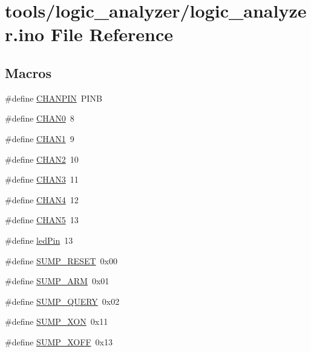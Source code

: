 \hypertarget{logic__analyzer_8ino}{\section{tools/logic\-\_\-analyzer/logic\-\_\-analyzer.ino File Reference}
\label{logic__analyzer_8ino}
}
\subsection*{Macros}
\begin{DoxyCompactItemize}
\item 
\#define \hyperlink{logic__analyzer_8ino_a28da84b93467b5e147457f6966a937d2}{C\-H\-A\-N\-P\-I\-N}~P\-I\-N\-B
\item 
\#define \hyperlink{logic__analyzer_8ino_a7701a5ed2cabd7662018fca8a32a1860}{C\-H\-A\-N0}~8
\item 
\#define \hyperlink{logic__analyzer_8ino_a6eb3bf1fa3bc8d0709305951d297ac0b}{C\-H\-A\-N1}~9
\item 
\#define \hyperlink{logic__analyzer_8ino_a0eb944265047f642ca0bae08e0b08e97}{C\-H\-A\-N2}~10
\item 
\#define \hyperlink{logic__analyzer_8ino_a4d97ed6a80ea7e3624b6730fc32a49e8}{C\-H\-A\-N3}~11
\item 
\#define \hyperlink{logic__analyzer_8ino_aea2b38cf4326607bde7b99bd91a7cec0}{C\-H\-A\-N4}~12
\item 
\#define \hyperlink{logic__analyzer_8ino_aa6517cf729cb97867b1448ece56f0bc5}{C\-H\-A\-N5}~13
\item 
\#define \hyperlink{logic__analyzer_8ino_a49ba715e713d99d1a5c20429dacaf073}{led\-Pin}~13
\item 
\#define \hyperlink{logic__analyzer_8ino_a1e1050eb144e2e56cb85daa640c53e34}{S\-U\-M\-P\-\_\-\-R\-E\-S\-E\-T}~0x00
\item 
\#define \hyperlink{logic__analyzer_8ino_a1173a24bbfa5834edeb8df0eaaa0ee9e}{S\-U\-M\-P\-\_\-\-A\-R\-M}~0x01
\item 
\#define \hyperlink{logic__analyzer_8ino_a2096a8b8f3a8356efdb66b8d5e09c451}{S\-U\-M\-P\-\_\-\-Q\-U\-E\-R\-Y}~0x02
\item 
\#define \hyperlink{logic__analyzer_8ino_a323ad695fb6ded1678874de665cf105e}{S\-U\-M\-P\-\_\-\-X\-O\-N}~0x11
\item 
\#define \hyperlink{logic__analyzer_8ino_a3c7313cddd98001c55d0ab7a2218a4b7}{S\-U\-M\-P\-\_\-\-X\-O\-F\-F}~0x13
\item 

\end{DoxyCompactItemize}

